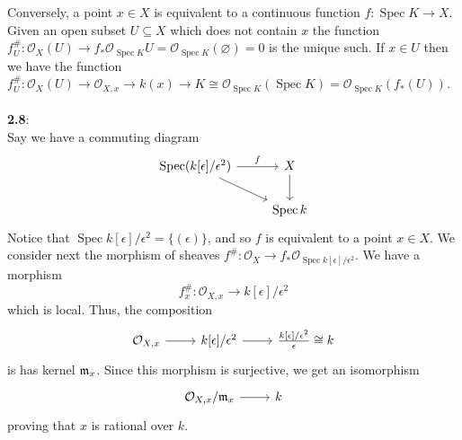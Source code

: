 \documentclass[12pt]{article}
\numberwithin{thm}{subsection}
\numberwithin{defn}{subsection}
\numberwithin{lemma}{subsection}
\numberwithin{example}{subsection}
\numberwithin{notation}{subsection}
\numberwithin{cor}{subsection}
\numberwithin{remark}{subsection}
\numberwithin{condition}{subsection}
\numberwithin{question}{subsection}
\numberwithin{construction}{subsection}
\numberwithin{construction}{subsection}
\numberwithin{construction}{subsection}
\newcommand{\call}[1]{\mathcal{#1}}
\newcommand{\lto}{\longrightarrow}
\begin{document}
Conversely, a point $x \in X$ is equivalent to a continuous function $f: \operatorname{Spec}K \to X$. Given an open subset $U \subseteq X$ which does not contain $x$ the function $f^{\#}_U: \call{O}_X(U) \to f_\ast\call{O}_{\operatorname{Spec}K}U = \call{O}_{\operatorname{Spec}K}(\varnothing) = 0$ is the unique such. If $x \in U$ then we have the function $f_U^{\#}: \call{O}_X(U) \to \call{O}_{X,x} \to k(x) \to K \cong \call{O}_{\operatorname{Spec}K}(\operatorname{Spec}K) = \call{O}_{\operatorname{Spec}K}(f_\ast(U))$.\\\\
%
\textbf{2.8}:\\
Say we have a commuting diagram
\[\begin{tikzcd}
	{\operatorname{Spec}(k[\epsilon]/\epsilon^2)} & X \\
	& {\operatorname{Spec}k}
	\arrow["f", from=1-1, to=1-2]
	\arrow[from=1-1, to=2-2]
	\arrow[from=1-2, to=2-2]
\end{tikzcd}\]
Notice that $\operatorname{Spec}k[\epsilon]/\epsilon^2 = \{(\epsilon)\}$, and so $f$ is equivalent to a point $x \in X$. We consider next the morphism of sheaves $f^{\#}: \mathcal{O}_{X} \lto f_\ast\mathcal{O}_{\operatorname{Spec}k[\epsilon]/\epsilon^2}$. We have a morphism
\begin{equation}
\label{eq:local_map_rationa}
    f^{\#}_x: \mathcal{O}_{X,x} \lto k[\epsilon]/\epsilon^2
\end{equation}
which is local. Thus, the composition
\[\begin{tikzcd}
	{\mathcal{O}_{X,x}} & {k[\epsilon]/\epsilon^2} & {\frac{k[\epsilon]/\epsilon^2}{\epsilon} \cong k}
	\arrow[from=1-1, to=1-2]
	\arrow[from=1-2, to=1-3]
\end{tikzcd}\]
is has kernel $\frak{m}_x$. Since this morphism is surjective, we get an isomorphism
\[\begin{tikzcd}
	{\mathcal{O}_{X,x}/\frak{m}_x} & k
	\arrow[from=1-1, to=1-2]
\end{tikzcd}\]
proving that $x$ is rational over $k$.
\end{document}
